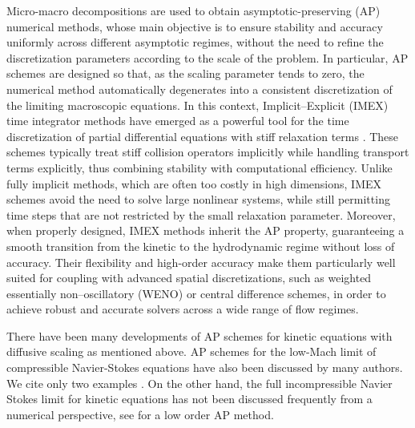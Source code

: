 \documentclass[final,11pt]{siamart251216}
\numberwithin{equation}{section}
\theoremstyle{definition}
\theoremstyle{remark}
\begin{document}
Micro-macro decompositions are used to obtain  asymptotic-preserving (AP) numerical methods, whose main objective is to ensure stability and accuracy uniformly across different asymptotic regimes, without the need to refine the discretization parameters according to the scale of the problem. In particular, AP schemes are designed so that, as the scaling parameter tends to zero, the numerical method automatically degenerates into a consistent discretization of the limiting macroscopic equations. 
In this context, Implicit–Explicit (IMEX) time integrator methods have emerged as a powerful tool for the time discretization of partial differential equations with stiff relaxation terms \cite{DimarcoAP1,DimarcoAP2,IMEX_PR,Bosc,Bosc1,Carp,AscherRuuthSpiteri1997,BoscarinoPareschiRusso2024,Ruuth,Multis,Bosc2}. These schemes typically treat stiff collision operators implicitly while handling transport terms explicitly, thus combining stability with computational efficiency. Unlike fully implicit methods, which are often too costly in high dimensions, IMEX schemes avoid the need to solve large nonlinear systems, while still permitting time steps that are not restricted by the small relaxation parameter. Moreover, when properly designed, IMEX methods inherit the AP property, guaranteeing a smooth transition from the kinetic to the hydrodynamic regime without loss of accuracy. Their flexibility and high-order accuracy make them particularly well suited for coupling with advanced spatial discretizations, such as weighted essentially non--oscillatory (WENO) \cite{Shu} or central difference schemes, in order to achieve robust and accurate solvers across a wide range of flow regimes.

There have been many developments of AP schemes for kinetic equations with diffusive scaling as mentioned above. AP schemes for the low-Mach limit of compressible Navier-Stokes equations have also been discussed by many authors. We cite only two examples \cite{DegondTang2011,DimarcoLoubereVignal2017}.
On the other hand, the full incompressible Navier Stokes limit for kinetic equations has 
not been discussed frequently  from a numerical perspective, see \cite{K992} for a low order AP method. 
\end{document}
